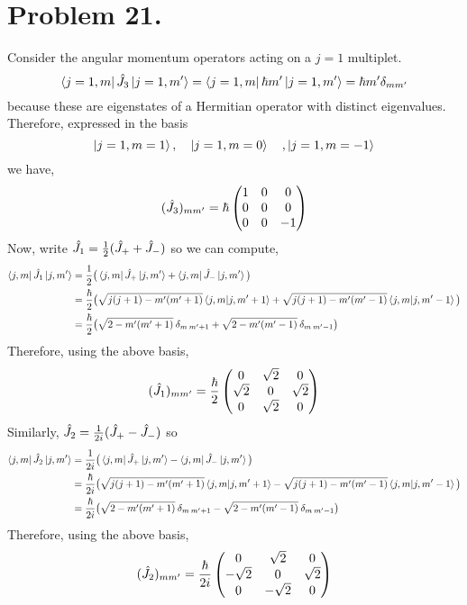 \documentclass[12pt]{extarticle}
\begin{document}
\section{Problem 21.}
Consider the angular momentum operators acting on a $j = 1$ multiplet.
\[\left< j = 1, m \right| \hat{J}_3 \left| j = 1, m' \right> = \left< j = 1, m \right| \hbar m' \left| j = 1, m' \right> = \hbar m' \delta_{mm'}\] because these are eigenstates of a Hermitian operator with distinct eigenvalues. Therefore, expressed in the basis \[\left| j = 1, m = 1 \right>, \quad \left| j = 1, m = 0 \right>\quad, \left| j = 1, m = -1 \right>\]
we have,
\[(\hat{J}_3)_{mm'} = \hbar
\begin{pmatrix}
1 & 0 & 0 \\
0 & 0 & 0 \\
0 & 0 & -1
\end{pmatrix}
\]
Now, write $\hat{J}_1 = \frac{1}{2} (\hat{J}_{+} + \hat{J}_{-})$ so we can compute,
\begin{align*}
\left< j, m \right| \hat{J}_1 \left| j, m' \right> & = \frac{1}{2}\big(\left< j, m \right| \hat{J}_{+} \left| j, m' \right> + \left< j, m \right| \hat{J}_{-} \left| j, m' \right>\big) \\ & = \frac{\hbar}{2} \big( \sqrt{j(j+1) - m'(m'+1)} \left< j, m  | j, m' + 1 \right> + \sqrt{j(j+1) - m'(m'-1)} \left< j, m  | j, m' - 1 \right> \big) \\ & = \frac{\hbar}{2} \big( \sqrt{2 - m'(m'+1)} \: \delta_{m \: m'+1} + \sqrt{2 - m'(m'-1)} \: \delta_{m \: m'-1} \big)
\end{align*}
Therefore, using the above basis,
\[(\hat{J}_1)_{mm'} = \frac{\hbar}{2}
\begin{pmatrix}
0 & \sqrt{2} & 0 \\
\sqrt{2} & 0 & \sqrt{2} \\
0 & \sqrt{2} & 0
\end{pmatrix}
\]
Similarly, $\hat{J}_2 = \frac{1}{2i} (\hat{J}_{+} - \hat{J}_{-})$ so
\begin{align*}
\left< j, m \right| \hat{J}_2 \left| j, m' \right> & = \frac{1}{2i}\big(\left< j, m \right| \hat{J}_{+} \left| j, m' \right> - \left< j, m \right| \hat{J}_{-} \left| j, m' \right>\big) \\ & = \frac{\hbar}{2i} \big( \sqrt{j(j+1) - m'(m'+1)} \left< j, m  | j, m' + 1 \right> - \sqrt{j(j+1) - m'(m'-1)} \left< j, m  | j, m' - 1 \right> \big) \\ & = \frac{\hbar}{2i} \big( \sqrt{2 - m'(m'+1)} \: \delta_{m \: m'+1} - \sqrt{2 - m'(m'-1)} \: \delta_{m \: m'-1} \big)
\end{align*}
Therefore, using the above basis,
\[(\hat{J}_2)_{mm'} = \frac{\hbar}{2i}
\begin{pmatrix}
0 & \sqrt{2} & 0 \\
-\sqrt{2} & 0 & \sqrt{2} \\
0 & -\sqrt{2} & 0
\end{pmatrix}
\]
\end{document}
